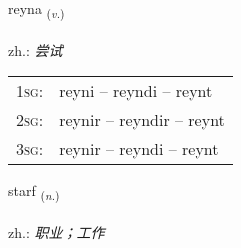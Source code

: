 \documentclass[frontgrid, backgrid]{flacards}\usepackage[]{graphicx}\usepackage[]{xcolor}
\begin{document}
\renewcommand{\flhead}{\vskip5pt \fboxsep=0pt {\small\bfseries\footnotesize Sagnorð | 动词}}
\renewcommand{\fcfoot}{\vskip5pt \fboxsep=0pt \hspace{2pt}{\small\bfseries\footnotesize 1K}}

\renewcommand{\blhead}{\vskip5pt {\small\bfseries\footnotesize Sagnorð | 动词 }}
\renewcommand{\bcfoot}{\vskip5pt \hspace{2pt}{\small\bfseries\footnotesize 1K}}


{reyna \small{\textsubscript{(\textit{v.})}} \\[1ex] %
\textphonetic{[reiːna]} \\
zh.: \emph{尝试} \\  [2ex]
\renewcommand*{\arraystretch}{0.8}
\begin{tabular}{p{1cm}l}
\textsc{1sg}: & reyni -- reyndi -- reynt \\ 
\textsc{2sg}: & reynir -- reyndir -- reynt \\ 
\textsc{3sg}: & reynir -- reyndi -- reynt \\ 
\end{tabular}
}

\renewcommand{\flhead}{\vskip5pt \fboxsep=0pt {\small\bfseries\footnotesize Nafnorð | 名词}}
\renewcommand{\fcfoot}{\vskip5pt \fboxsep=0pt \hspace{2pt}{\small\bfseries\footnotesize 1K}}

\renewcommand{\blhead}{\vskip5pt {\small\bfseries\footnotesize Nafnorð | 名词 }}
\renewcommand{\bcfoot}{\vskip5pt \hspace{2pt}{\small\bfseries\footnotesize 1K}}


{starf \small{\textsubscript{(\textit{n.})}} \\[1ex] %
\textphonetic{[starv]} \\
zh.: \emph{职业；工作} \\  [2ex]
\renewcommand*{\arraystretch}{0.8}
}
\end{document}
